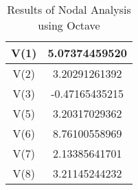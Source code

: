 \begin{table}[h] 
 \centering 
 \begin{tabular}{ c c } 
\hline
V(1) & 5.07374459520 \\ 
 \hline
V(2) & 3.20291261392 \\ 
 \hline
V(3) & -0.47165435215 \\ 
 \hline
V(5) & 3.20317029362 \\ 
 \hline
V(6) & 8.76100558969 \\ 
 \hline
V(7) & 2.13385641701 \\ 
 \hline
V(8) & 3.21145244232 \\ 
 \hline
  \end{tabular} 
 \caption{Results of Nodal Analysis using Octave} 
 \label{tab:mesh_results} 
 \end{table} 
 